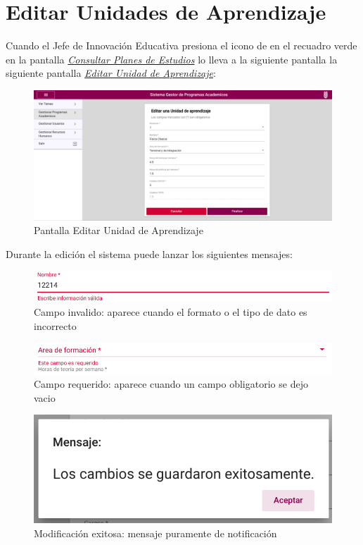 \section{Editar Unidades de Aprendizaje}
Cuando el Jefe de Innovación Educativa presiona el icono de \IUbutton{+} en el recuadro verde en la pantalla \hyperlink{consultarUA}{\textit{Consultar Planes de Estudios}} lo lleva a la siguiente pantalla la siguiente pantalla \hyperlink{editarUA}{\textit{Editar Unidad de Aprendizaje}}:\\
\begin{figure}[!hbtp]
    \centering
    \hypertarget{editarUA}{\includegraphics[width=0.7\linewidth]{images/GUA/editarUA}}
    \caption{Pantalla Editar Unidad de Aprendizaje}
    \label{editarUA}
\end{figure}
Durante la edición el sistema puede lanzar los siguientes mensajes:\\
\begin{figure}[!hbtp]
    \centering
    \hypertarget{invalidoE}{\includegraphics[width=0.7\linewidth]{images/GUA/invalido}}
    \caption{Campo invalido: aparece cuando el formato o el tipo de dato es incorrecto}
    \label{invalidoE}
\end{figure}
\begin{figure}[!hbtp]
    \centering
    \hypertarget{requeridoE}{\includegraphics[width=0.7\linewidth]{images/GUA/requerido}}
    \caption{Campo requerido: aparece cuando un campo obligatorio se dejo vacio}
    \label{requeridoE}
\end{figure}
\begin{figure}[!hbtp]
    \centering
    \hypertarget{modificacion}{\includegraphics[width=0.7\linewidth]{images/GUA/modificacion}}
    \caption{Modificación exitosa: mensaje puramente de notificación}
    \label{modificacion}
\end{figure}

